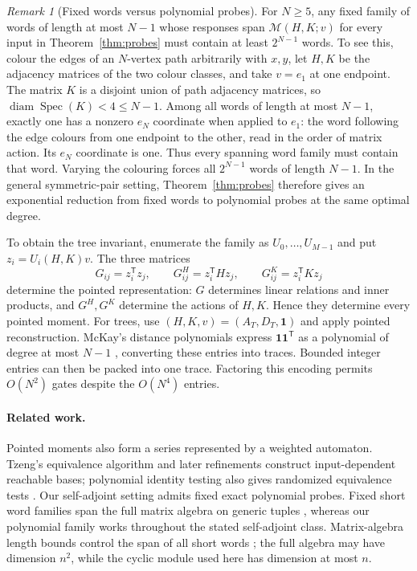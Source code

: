 \documentclass[11pt,letterpaper]{article}
\theoremstyle{definition}\newtheorem{definition}[theorem]{Definition}
\theoremstyle{remark}\newtheorem{remark}[theorem]{Remark}
\DeclareMathOperator{\diam}{diam}\DeclareMathOperator{\Spec}{Spec}
\newcommand{\one}{\mathbf1}\newcommand{\M}{\mathcal M}
\begin{document}
\begin{remark}[Fixed words versus polynomial probes]\label{rem:wordlower}
For $N\ge5$, any fixed family of words of length at most $N-1$ whose responses span $\M(H,K;v)$ for every input in Theorem~\ref{thm:probes} must contain at least $2^{N-1}$ words. To see this, colour the edges of an $N$-vertex path arbitrarily with $x,y$, let $H,K$ be the adjacency matrices of the two colour classes, and take $v=e_1$ at one endpoint. The matrix $K$ is a disjoint union of path adjacency matrices, so $\diam\Spec(K)<4\le N-1$. Among all words of length at most $N-1$, exactly one has a nonzero $e_N$ coordinate when applied to $e_1$: the word following the edge colours from one endpoint to the other, read in the order of matrix action. Its $e_N$ coordinate is one. Thus every spanning word family must contain that word. Varying the colouring forces all $2^{N-1}$ words of length $N-1$. In the general symmetric-pair setting, Theorem~\ref{thm:probes} therefore gives an exponential reduction from fixed words to polynomial probes at the same optimal degree.
\end{remark}

To obtain the tree invariant, enumerate the family as $U_0,\ldots,U_{M-1}$ and put $z_i=U_i(H,K)v$. The three matrices
\[
G_{ij}=z_i^{\mathsf T}z_j,\qquad
G^H_{ij}=z_i^{\mathsf T}Hz_j,\qquad
G^K_{ij}=z_i^{\mathsf T}Kz_j
\]
determine the pointed representation: $G$ determines linear relations and inner products, and $G^H,G^K$ determine the actions of $H,K$. Hence they determine every pointed moment. For trees, use $(H,K,v)=(A_T,D_T,\one)$ and apply pointed reconstruction. McKay's distance polynomials express $\one\one^{\mathsf T}$ as a polynomial of degree at most $N-1$ \cite[Lemma 5.1 and Corollary 5.2]{McKay}, converting these entries into traces. Bounded integer entries can then be packed into one trace. Factoring this encoding permits $O(N^2)$ gates despite the $O(N^4)$ entries.

\paragraph{Related work.}
Pointed moments also form a series represented by a weighted automaton. Tzeng's equivalence algorithm and later refinements construct input-dependent reachable bases; polynomial identity testing also gives randomized equivalence tests \cite{Tzeng,KMOWW}. Our self-adjoint setting admits fixed exact polynomial probes. Fixed short word families span the full matrix algebra on generic tuples \cite{KlepSpenko,JiaCapel}, whereas our polynomial family works throughout the stated self-adjoint class. Matrix-algebra length bounds control the span of all short words \cite{Paz,Pappacena,Shitov,Sprung}; the full algebra may have dimension $n^2$, while the cyclic module used here has dimension at most $n$.
\end{document}
